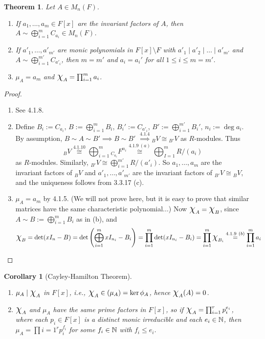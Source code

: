 \documentclass[11pt]{book}
\newcounter{counter}
\newtheorem{theorem}[counter]{Theorem}   \newtheorem*{theorem*}{Theorem}   \newtheorem{lemma}[counter]{Lemma}   \newtheorem{corollary}[counter]{Corollary}
\theoremstyle{definition}   \newtheorem{defn}[counter]{Definition} %
\newcommand{\bs}{\setminus}   \newcommand{\A}{\mathcal{A}}   \newcommand{\sy}{\textnormal{Syl}}   \newcommand{\size}[1]{\left| #1 \right|}
\newcommand{\Chi}{\mbox{\Large $\chi$}}
\newcommand{\vs}{\vspace{8pt}}   \newcommand{\hs}{\hspace{8pt}}
\numberwithin{counter}{chapter}
\begin{document}
\vs

\begin{theorem}
Let $A \in M_n(F)$.
\begin{enumerate}
\item[(a)] If $a_1,\dots,a_m \in F[x]$ are the invariant factors of $A$, then $A \sim \bigoplus_{i=1}^m C_{a_i} \in M_n(F)$.
\item[(b)] If $a'_1,\dots,a'_{m'}$ are monic polynomials in $F[x]\bs F$ with $a'_1\mid a'_2 \mid \dots \mid a'_{m'}$ and $A \sim \bigoplus_{i=1}^{m'} C_{a'_i}$, then $m = m'$ and $a_i = a_i'$ for all $1 \leq i \leq m = m'$.
\item[(c)] $\mu_A = a_m$ and $\Chi_A = \prod_{i=1}^m a_i$.
\end{enumerate}
\end{theorem}

\begin{proof}\
\begin{enumerate}
\item[(a)] See 4.1.8.
\item[(b)] Define $B_i := C_{a_i}$, $B := \bigoplus_{i=1}^m B_i$, $B_i' := C_{a'_i}$, $B' := \bigoplus_{i=1}^{m'} B_i'$, $n_i := \deg a_i$. By assumption, $B \sim A \sim B' \implies B \sim B'$ $\overset{4.1.4}{\implies} {_BV} \cong {_{B'}V}$ as $R$-modules. Thus
	\[{_BV} \overset{4.1.10}{\cong} \bigoplus_{i=1}^m {_{C_{a_i}}}F^{n_i} \overset{4.1.9 \ (a)}{\cong} \bigoplus_{I=1}^m R/(a_i) \]
as $R$-modules. Similarly, ${_{B'}V} \cong \bigoplus_{i=1}^{m'} R/(a'_i)$. So $a_1,\dots,a_m$ are the invariant factors of ${_BV}$ and $a'_1,\dots,a'_{m'}$ are the invariant factors of ${_{B'}V} \cong {_BV}$, and the uniqueness follows from 3.3.17 (c).

\item[(c)] $\mu_A = a_m$ by 4.1.5.  (We will not prove here, but it is easy to prove that similar matrices have the same characteristic polynomial...) Now $\Chi_A = \Chi_B$, since $A \sim B := \bigoplus_{i=1}^m B_i$ as in (b), and
	\[\Chi_B = \det(xI_n-B) = \det \left(\bigoplus_{i=1}^m xI_{n_i} - B_i\right) = \prod_{i=1}^m \det(xI_{n_i} - B_i) = \prod_{i=1}^m \Chi_{B_i} \overset{4.1.9\ (b)}{=} \prod_{i=1}^m a_i \]
\end{enumerate}
\end{proof}

\vs

\begin{corollary}[Cayley-Hamilton Theorem]\
\begin{enumerate}
\item[(a)] $\mu_A \mid \Chi_A$ in $F[x]$, i.e., $\Chi_A \in (\mu_A) = \ker \phi_A$, hence $\Chi_A(A) = 0$.
\item[(b)] $\Chi_A$ and $\mu_A$ have the same prime factors in $F[x]$, so if $\Chi_A = \prod_{i=1}^r p_i^{e_i}$, where each $p_i \in F[x]$ is a distinct monic irreducible and each $e_i \in \operatorname{\mathbb{N}}$, then $\mu_A = \prod{i=1}^r p_i^{f_i}$ for some $f_i \in \operatorname{\mathbb{N}}$ with $f_i \leq e_i$.
\end{enumerate}
\end{corollary}
\end{document}

